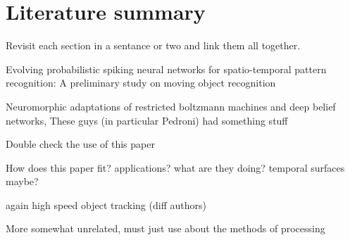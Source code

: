 
\section{Literature summary}      %
Revisit each section in a sentance or two and link them all together.

Evolving probabilistic spiking neural networks for spatio-temporal pattern recognition: A preliminary study on moving object recognition \cite{kasabov2011evolving}

Neuromorphic adaptations of restricted boltzmann machines and deep belief networks, These guys (in particular Pedroni) had something stuff \cite{pedroni2013neuromorphic}


Double check the use of this paper \cite{gil2014active}

How does this paper fit? applications? what are they doing? temporal surfaces maybe? \cite{davide2014high}

again high speed object tracking (diff authors) \cite{saner2014high} 

More somewhat unrelated, must just use about the methods of processing \cite{mueggler2015continuous}
